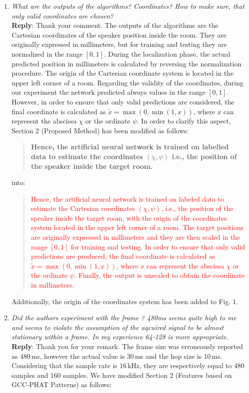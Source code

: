 \documentclass[11pt, technote, letterpaper, oneside, onecolumn]{IEEEtran}
\begin{document}
\begin{enumerate}
\item \textit{What are the outputs of the algorithms? Coordinates? How to make sure, that only valid coordinates are chosen?\\}
\textbf{Reply}: Thank your comment. The outputs of the algorithms are the Cartesian coordinates of the speaker position inside the room. They are originally expressed in millimeters, but for training and testing they are normalized in the range $[0,1]$. During the localization phase, the actual predicted position in millimeters is calculated by reversing the normalization procedure. The origin of the Cartesian coordinate system is located in the upper left corner of a room. Regarding the validity of the coordinates, during our experiment the network predicted always values in the range $[0,1]$. However, in order to ensure that only valid predictions are considered, the final coordinate is calculated as $\tilde{x} =\max(0, \min(1, x))$, where $x$ can represent the abscissa $\chi$ or the ordinate $\psi$.  In order to clarify this aspect, Section 2 (Proposed Method) has been modified as follows:
\begin{quote}
	\textbf{Hence, the artificial neural network is trained on labelled data to estimate the coordinates $(\chi,\psi)$ i.e., the position of the speaker inside the target room.}
\end{quote}
into:
\begin{quote}
	\textcolor{red}{Hence, the artificial neural network is trained on labeled data to estimate the Cartesian coordinates $\left ( \chi,\psi \right )$, i.e., the position of the speaker inside the target room, with the origin of the coordinates system located in the upper left corner of a room. The target positions are originally expressed in millimeters and they are then scaled in the range $[0,1]$ for training and testing. In order to ensure that only valid predictions are produced, the final coordinate is calculated as $\tilde{x} =\max(0, \min(1, x))$, where $x$ can represent the abscissa $\chi$ or the ordinate $\psi$. Finally, the output is unscaled to obtain the coordinate in millimeters.}
\end{quote}
Additionally, the origin of the coordinates system has been added to Fig. 1.


\item \textit{Did the authors experiment with the frame ? 480ms seems quite high to me and seems to violate the assumption of the aqcuired signal to be almost stationary within a frame. In my experience 64-128 is more appropriate.\\}
\textbf{Reply}: Thank you for your remark. The frame size was erroneously reported as 480\,ms, however the actual value is 30\,ms and the hop size is 10\,ms. Considering that the sample rate is 16\,kHz, they are respectively equal to 480 samples and 160 samples. We have modified Section 2 (Features based on GCC-PHAT Patterns) as follows:


\end{enumerate}
\end{document}
